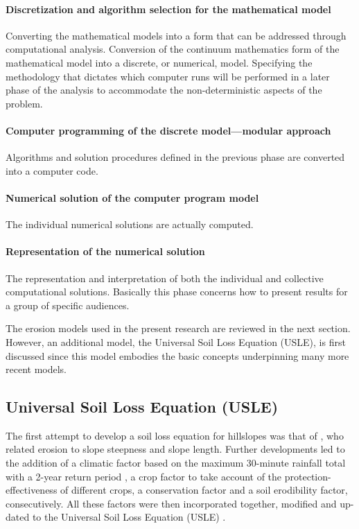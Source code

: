 \paragraph{Discretization and algorithm selection for the mathematical
model}
Converting the mathematical models into a form that can be addressed through
computational analysis. Conversion of the continuum mathematics form of the
mathematical model into a discrete, or numerical, model. Specifying the
methodology that dictates which computer runs will be performed in a later phase
of the analysis to accommodate the non-deterministic aspects of the problem.

\paragraph{Computer programming of the discrete model---modular approach}
Algorithms and solution procedures defined in the previous phase are converted
into a computer code.

\paragraph{Numerical solution of the computer program model}
The individual numerical solutions are actually computed.

\paragraph{Representation of the numerical solution}
The representation and interpretation of both the individual and collective
computational solutions. Basically this phase concerns how to present results
for a group of specific audiences.

The erosion models used in the present research are reviewed in the next
section. However, an additional model, the Universal Soil Loss Equation (USLE),
is first discussed since this model embodies the basic concepts underpinning
many more recent models.

\subsection{Universal Soil Loss Equation (USLE)}
\label{sec:UniversalSoilLossEquationUSLE}

The first attempt to develop a soil loss equation for hillslopes was that of
\citet{zingg1940-59}, who related erosion to slope steepness and slope length.
Further developments led to the addition of a climatic factor based on the
maximum 30-minute rainfall total with a 2-year return period
\citep{musgrave1947-133}, a crop factor to take account of the
protection-effectiveness of different crops, a conservation factor and a soil
erodibility factor, consecutively. All these factors were then incorporated
together, modified and up-dated to the Universal Soil Loss Equation (USLE)
\citep{wischmeier1978-537}.

